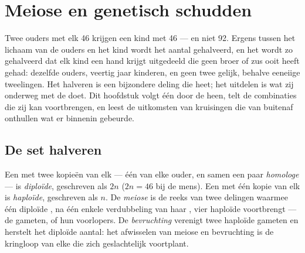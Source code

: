 \chapter{Meiose en genetisch schudden}\label{ch:g12:meiosis-genetic-shuffling}

Twee ouders met elk 46  krijgen een kind met 46 --- en niet
92. Ergens tussen het lichaam van de ouders en het kind wordt het aantal
gehalveerd, en het wordt zo gehalveerd dat elk kind een hand krijgt
uitgedeeld die geen broer of zus ooit heeft gehad: dezelfde ouders,
veertig jaar kinderen, en geen twee gelijk, behalve eeneiige tweelingen.
Het halveren is een bijzondere deling die  heet; het uitdelen is wat
zij onderweg met de  doet. Dit hoofdstuk volgt één  door de
 heen, telt de combinaties die zij kan voortbrengen, en leest de
uitkomsten van kruisingen die van buitenaf onthullen wat er binnenin
gebeurde.

\section{De set halveren}

\begin{definition}\label{def:g12:meiosis-genetic-shuffling:meiosis}
Een  met twee kopieën van elk  --- één van elke ouder, en
samen een paar \emph{homologe } --- is
\emph{diploïde}, geschreven als $2n$ ($2n = 46$ bij de
mens). Een  met één kopie van elk is \emph{haploïde},
geschreven als $n$. De \emph{meiose} is de reeks van twee
delingen waarmee één diploïde , na één enkele verdubbeling van haar
, vier haploïde  voortbrengt --- de gameten, of hun voorlopers.
De \emph{bevruchting} verenigt twee haploïde gameten en herstelt het
diploïde aantal: het afwisselen van meiose en bevruchting is de kringloop
van elke  die zich geslachtelijk voortplant.
\end{definition}

